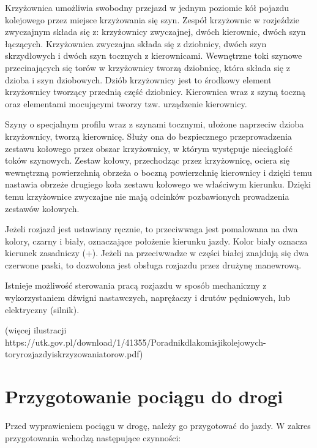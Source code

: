 Krzyżownica umożliwia swobodny przejazd w jednym poziomie kół pojazdu kolejowego przez miejsce krzyżowania się szyn.
Zespół krzyżownic w rozjeździe zwyczajnym składa się z:
krzyżownicy zwyczajnej, dwóch kierownic, dwóch szyn łączących.
Krzyżownica zwyczajna składa się z dziobnicy, dwóch szyn skrzydłowych i dwóch szyn tocznych z kierownicami. Wewnętrzne toki szynowe przecinających się torów w krzyżownicy tworzą
dziobnicę, która składa się z dzioba i szyn dziobowych. Dziób krzyżownicy jest to środkowy element
krzyżownicy tworzący przednią część dziobnicy. Kierownica wraz z szyną toczną oraz elementami
mocującymi tworzy tzw. urządzenie kierownicy.

Szyny o specjalnym profilu wraz z szynami tocznymi, ułożone naprzeciw dzioba krzyżownicy, tworzą kierownicę.
Służy ona do bezpiecznego przeprowadzenia zestawu kołowego przez obszar krzyżownicy, w którym występuje nieciągłość toków szynowych.  Zestaw kołowy, przechodząc przez krzyżownicę, ociera się wewnętrzną
powierzchnią obrzeża o boczną powierzchnię kierownicy i dzięki temu nastawia obrzeże drugiego koła zestawu kołowego we właściwym kierunku. Dzięki temu krzyżownice zwyczajne nie mają odcinków pozbawionych prowadzenia zestawów kołowych.

Jeżeli rozjazd jest ustawiany ręcznie, to przeciwwaga jest pomalowana na dwa kolory, czarny i biały, oznaczające położenie kierunku jazdy. Kolor biały oznacza kierunek zasadniczy (+). Jeżeli na przeciwwadze w części białej znajdują się dwa czerwone paski, to dozwolona jest obsługa rozjazdu przez drużynę manewrową.

Istnieje możliwość sterowania pracą rozjazdu w sposób mechaniczny z wykorzystaniem dźwigni nastawczych, naprężaczy i drutów pędniowych, lub elektryczny (silnik).

(więcej ilustracji https://utk.gov.pl/download/1/41355/Poradnikdlakomisjikolejowych-toryrozjazdyiskrzyzowaniatorow.pdf)

\section{Przygotowanie pociągu do drogi}

Przed wyprawieniem pociągu w drogę, należy go przygotować do jazdy. W zakres przygotowania wchodzą następujące czynności:

